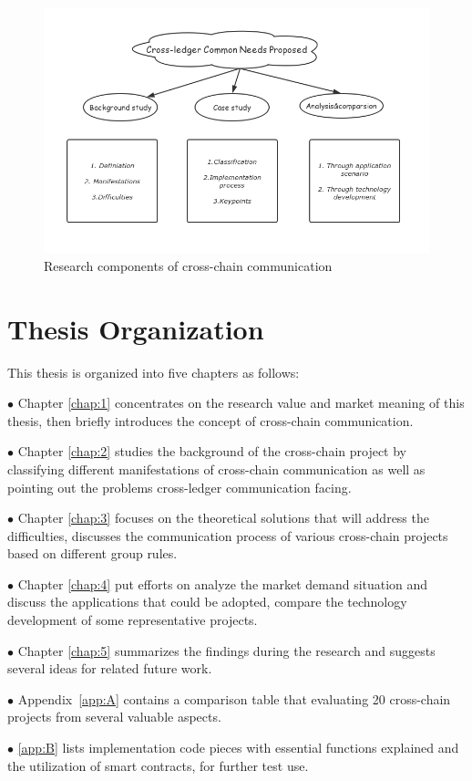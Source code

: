     
    \begin{figure}[H]
    \includegraphics[width=1\textwidth]{./figures/contri.png}
    \centering
    \caption{Research components of cross-chain communication}%
    \centering
    \label{fig:contri}
    \end{figure}
    
\section{Thesis Organization}

This thesis is organized into five chapters as follows:

$\bullet $ Chapter \ref{chap:1} concentrates on the research value and market meaning of this thesis, then briefly introduces the concept of cross-chain communication.

$\bullet $ Chapter \ref{chap:2} studies the background of the cross-chain project by classifying different manifestations of cross-chain communication as well as pointing out the problems cross-ledger communication facing.

$\bullet $ Chapter \ref{chap:3} focuses on the theoretical solutions that will address the difficulties, discusses the communication process of various cross-chain projects based on different group rules. 

$\bullet $ Chapter \ref{chap:4} put efforts on analyze the market demand situation and discuss the applications that could be adopted, compare the technology development of some representative projects.

$\bullet $ Chapter \ref{chap:5} summarizes the findings during the research and suggests several ideas for related future work.

$\bullet $ Appendix~\ref{app:A} contains a comparison table that evaluating 20 cross-chain projects from several valuable aspects.

$\bullet $ \ref{app:B} lists implementation code pieces with essential functions explained and the utilization of smart contracts, for further test use.
  